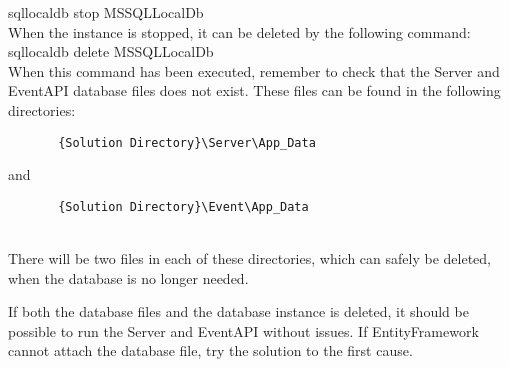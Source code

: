 \indent	sqllocaldb stop MSSQLLocalDb\\

When the instance is stopped, it can be deleted by the following command:\\

\indent	sqllocaldb delete MSSQLLocalDb\\

When this command has been executed, remember to check that the Server and EventAPI database files does not exist. These files can be found in the following directories:\\

\begin{verbatim}	   {Solution Directory}\Server\App_Data    \end{verbatim} and
\begin{verbatim}	   {Solution Directory}\Event\App_Data\end{verbatim} \\

There will be two files in each of these directories, which can safely be deleted, when the database is no longer needed.

If both the database files and the database instance is deleted, it should be possible to run the Server and EventAPI without issues. If EntityFramework cannot attach the database file, try the solution to the first cause.